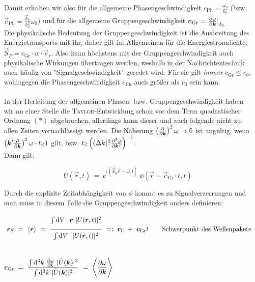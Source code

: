 Damit erhalten wir also für die allgemeine Phasengeschwindigkeit $c_{\text{Ph}} = \frac{\omega_0}{k_0}$ (bzw. $\vec{c}_{\text{Ph}} = \frac{\vec{k}_0}{k_0^2}\omega_0$) und für die allgemeine Gruppengeschwindigkeit $\bm{c}_{\text{Gr}} = \left.\frac{\partial{\omega}}{\partial{\bm{k}}}\right|_{k_0}$\\
Die physikalische Bedeutung der Gruppengeschwindigkeit ist die Ausbreitung des Energietransports mit ihr, daher gilt im Allgemeinen für die Energiestromdichte: $\vec{S}_P = c_{\text{Gr}} \cdot w \cdot \vec{e}_r$. Also kann höchstens mit der Gruppengeschwindigkeit auch physikalische Wirkungen übertragen werden, weshalb in der Nachrichtentechnik auch häufig von "Signalgeschwindigkeit" geredet wird. Für sie gilt \emph{immer} $c_{\text{Gr}} \leq c_0$, wohingegen die Phasengeschwindigkeit $c_{\text{Ph}}$ auch größer als  $c_0$ sein kann.\\ 
\ \\
In der Herleitung der allgemeinen Phasen- bzw. Gruppengeschwindigkeit haben wir an einer Stelle die \textsc{Taylor}-Entwicklung schon vor dem Term quadratischer Ordnung $(*)$ abgebrochen, allerdings kann dieser und auch folgende nicht zu allen Zeiten vernachlässigt werden. Die Näherung \grqq{}$\left(\frac{\partial{}}{\partial{\bm{k}}}\right)^2\omega\rightarrow 0$\grqq{} ist ungültig, wenn $\left(\vec{k}'\pdiff{}{\vec{k}}\right)^2\omega \cdot t \mathsmaller{\mathsmaller{\gtrsim}} 1$ gilt, bzw. $t \mathsmaller{\mathsmaller{\gtrsim}} \left((\Delta k)^2 \pddiff{\omega}{\vec{k}}\right)^{-1}$.\\
Dann gilt:

\begin{equation*}
U(\vec{r},t) \ = \  e^{i(\vec{k}_0\vec{r}-\omega_0 t)} \ \phi(\vec{r} - \vec{c}_{\text{Gr}} \cdot t,t)
\end{equation*}

Durch die explizite Zeitabhängigkeit von $\phi$ kommt es zu Signalverzerrungen und man muss in diesem Falle die Gruppengeschwindigkeit anders definieren:

\begin{align*}
\vec{r}_S \ &= \ \langle\vec{r}\rangle \ = \ \frac{\Int{}{}{V} \ \vec{r} \ |U(\vec{r},t)|^2}{\Int{}{}{V} \ |U(\vec{r},t)|^2} \ =: \  \vec{r}_0 \ + \ \vec{c}_{\text{Gr}} t \qquad \text{Schwerpunkt des Wellenpakets}\\
\ \\
\vec{c}_{\text{Gr}}  \ &= \ \frac{\int\d^3 k \ \pdiff{\omega}{k} \ |\tilde{U}(\vec{k})|^2}{\int\d^3 k \ |\tilde{U}(\vec{k})|^2} \ = \ \Bigg\langle\pdiff{\omega}{\vec{k}}\Bigg\rangle
\end{align*}

